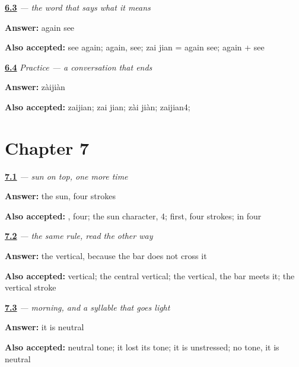 \noindent\begin{minipage}[t]{\linewidth}
\raggedright
\hyperlink{review-ZH-C06-zaijian-literal}{\textbf{6.3}} \emph{ — the word that says what it means}\par
\small \textbf{Answer:} again see\par
\footnotesize \textbf{Also accepted:} see again; again, see; zai jian = again see; again + see
\end{minipage}\par\medskip

\noindent\begin{minipage}[t]{\linewidth}
\raggedright
\hyperlink{review-ZH-C06-practice-close}{\textbf{6.4}} \emph{Practice — a conversation that ends}\par
\small \textbf{Answer:} zàijiàn\par
\footnotesize \textbf{Also accepted:} zaijian; zai jian; zài jiàn; zaijian4; 
\end{minipage}\par\medskip

\section*{Chapter 7}

\noindent\begin{minipage}[t]{\linewidth}
\raggedright
\hyperlink{review-ZH-W07-zao-top}{\textbf{7.1}} \emph{ — sun on top, one more time}\par
\small \textbf{Answer:} the sun, four strokes\par
\footnotesize \textbf{Also accepted:} , four; the sun character, 4;  first, four strokes;  in four
\end{minipage}\par\medskip

\noindent\begin{minipage}[t]{\linewidth}
\raggedright
\hyperlink{review-ZH-W07-shang-first}{\textbf{7.2}} \emph{ — the same rule, read the other way}\par
\small \textbf{Answer:} the vertical, because the bar does not cross it\par
\footnotesize \textbf{Also accepted:} vertical; the central vertical; the vertical, the bar meets it; the vertical stroke
\end{minipage}\par\medskip

\noindent\begin{minipage}[t]{\linewidth}
\raggedright
\hyperlink{review-ZH-C07-zaoshang-neutral}{\textbf{7.3}} \emph{ — morning, and a syllable that goes light}\par
\small \textbf{Answer:} it is neutral\par
\footnotesize \textbf{Also accepted:} neutral tone; it lost its tone; it is unstressed; no tone, it is neutral
\end{minipage}\par\medskip

